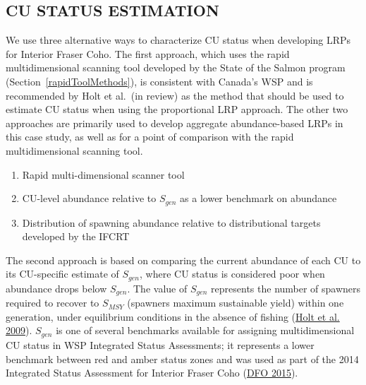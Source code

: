 \documentclass[11pt]{book}
\begin{document}
\hypertarget{cu-status-estimation}{%
\subsection{CU STATUS ESTIMATION}\label{cu-status-estimation}}

We use three alternative ways to characterize CU status when developing LRPs for Interior Fraser Coho. The first approach, which uses the rapid multidimensional scanning tool developed by the State of the Salmon program (Section~\ref{rapidToolMethods}), is consistent with Canada's WSP and is recommended by Holt et al.~(in review) as the method that should be used to estimate CU status when using the proportional LRP approach. The other two approaches are primarily used to develop aggregate abundance-based LRPs in this case study, as well as for a point of comparison with the rapid multidimensional scanning tool.
\begin{enumerate}
\def\labelenumi{\arabic{enumi})}

\item
  Rapid multi-dimensional scanner tool
\item
  CU-level abundance relative to \(S_{gen}\) as a lower benchmark on abundance
\item
  Distribution of spawning abundance relative to distributional targets developed by the IFCRT
\end{enumerate}
The second approach is based on comparing the current abundance of each CU to its CU-specific estimate of \(S_{gen}\), where CU status is considered poor when abundance drops below \(S_{gen}\). The value of \(S_{gen}\) represents the number of spawners required to recover to \(S_{MSY}\) (spawners maximum sustainable yield) within one generation, under equilibrium conditions in the absence of fishing (\protect\hyperlink{ref-holtIndicatorsStatusBenchmarks2009}{Holt et al. 2009}). \(S_{gen}\) is one of several benchmarks available for assigning multidimensional CU status in WSP Integrated Status Assessments; it represents a lower benchmark between red and amber status zones and was used as part of the 2014 Integrated Status Assessment for Interior Fraser Coho (\protect\hyperlink{ref-dfoWildSalmonPolicy2015}{DFO 2015}).
\end{document}
